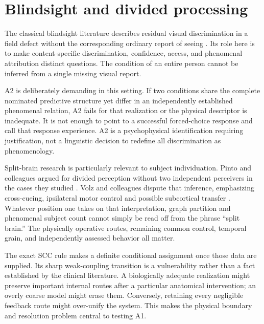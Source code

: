 \section{Blindsight and divided processing}\label{section:comparative:blindsight-and-divided-processing}
The classical blindsight literature describes residual visual discrimination in a field defect without the corresponding ordinary report of seeing \cite{Sanders1974}. Its role here is to make content-specific discrimination, confidence, access, and phenomenal attribution distinct questions. The condition of an entire person cannot be inferred from a single missing visual report.

A2 is deliberately demanding in this setting. If two conditions share the complete nominated predictive structure yet differ in an independently established phenomenal relation, A2 fails for that realization or the physical descriptor is inadequate. It is not enough to point to a successful forced-choice response and call that response experience. A2 is a psychophysical identification requiring justification, not a linguistic decision to redefine all discrimination as phenomenology.

Split-brain research is particularly relevant to subject individuation. Pinto and colleagues argued for divided perception without two independent perceivers in the cases they studied \cite{Pinto2017}. Volz and colleagues dispute that inference, emphasizing cross-cueing, ipsilateral motor control and possible subcortical transfer \cite{Volz2018}. Whatever position one takes on that interpretation, graph partition and phenomenal subject count cannot simply be read off from the phrase ``split brain.'' The physically operative routes, remaining common control, temporal grain, and independently assessed behavior all matter.

The exact SCC rule makes a definite conditional assignment once those data are supplied. Its sharp weak-coupling transition is a vulnerability rather than a fact established by the clinical literature. A biologically adequate realization might preserve important internal routes after a particular anatomical intervention; an overly coarse model might erase them. Conversely, retaining every negligible feedback route might over-unify the system. This makes the physical boundary and resolution problem central to testing A1.

